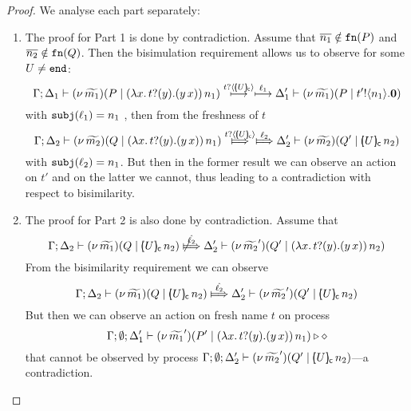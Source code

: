 \begin{lemma}
\begin{enumerate}
	\end{enumerate}
\end{lemma}

\begin{proof}
We analyse each part separately:
	\begin{enumerate}[1.]
		\item	The proof for Part 1 is done by contradiction.
				Assume that $\overline{n_1} \notin \mathtt{fn}(P)$ and $\overline{n_2} \notin \mathtt{fn}(Q)$.
				Then the bisimulation requirement allows us to observe for some $U \not= \mathtt{end}$:
				\[
					\Gamma; \Delta_1 \vdash (\nu\, \widetilde{m_1})(P \;|\; (\lambda x.\,t ? (y) . (y\, {x}))\, {n_1} )  \stackrel{ t ? \langle [\!\!(U)\!\!]_{\mathsf{c}} \rangle  }{\longmapsto} \stackrel{\ell_1}{\longmapsto}  \Delta_1' \vdash (\nu\, \widetilde{m_1})(P \;|\; t' ! \langle n_1 \rangle . \mathbf{0} )
				\]
				with $\mathtt{subj}(\ell_1) = n_1$ , then from the freshness of $t$
				\[
					\horel{\Gamma}{\Delta_2}{\newsp{\widetilde{m_2}}{Q \Par \appl{(\trvalx{t})}{n_1} }}
					{ \Hby{ \bactinp{t}{\omapchar{U}}  } \Hby{\ell_2} }
					{\Delta_2'}{\newsp{\widetilde{m_2}}{Q' \Par \appl{\omapchar{U}}{n_2}}}
				\]
				with $\mathtt{subj}(\ell_2) = n_1$. 
				But then in the former result we can observe an action on $t'$ and on the latter
				we cannot, thus leading to a contradiction with respect to bisimilarity.

		\item	The proof for Part 2 is also done by contradiction. Assume that
				\[
					\horel{\Gamma}{\Delta_2}{\newsp{\widetilde{m_1}}{Q \Par \appl{\omapchar{U}}{n_2} }} %
					{\not\Hby{\hat{\ell_2}}}
					{\Delta_2'}{\newsp{\widetilde{m_2}'}{Q' \Par \appl{(\trvalx{t})}{n_2} }} %
				\]
				From the bisimilarity requirement we can observe
				\[
					\horel{\Gamma}{\Delta_2}{\newsp{\widetilde{m_1}}{Q \Par \appl{\omapchar{U}}{n_2} }} %
					{\Hby{\hat{\ell_2}}}
					{\Delta_2'}{\newsp{\widetilde{m_2}'}{Q' \Par \appl{\omapchar{U}}{n_2} }} %
				\]
				But then we can observe an action on fresh name $t$ on process
				\[
					\Gamma; \emptyset; \Delta_1' \vdash (\nu\, \widetilde{m_1}')(P' \;|\; (\lambda x.\,t ? (y) . (y\, {x}))\, {n_1} ) \triangleright \diamond
				\]
				that cannot be observed by process
				$
					\Gamma; \emptyset; \Delta_2' \vdash (\nu\, \widetilde{m_2}')(Q' \;|\; [\!\!(U)\!\!]_{\mathsf{c}}\, {n_2} )
				$---a contradiction.


\end{enumerate}
\end{proof}
